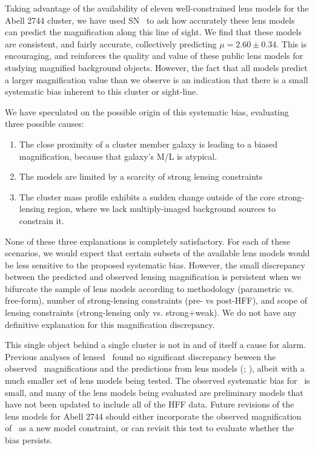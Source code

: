 Taking advantage of the availability of eleven well-constrained lens
models for the Abell 2744 cluster, we have used SN \tomas\ to ask
how accurately these lens models can predict the magnification along
this line of sight.   We find that these models are consistent, and
fairly accurate, collectively predicting $\mu=2.60\pm0.34$.  This is
encouraging, and reinforces the quality and value of these public lens
models for studying magnified background objects.   However, the fact
that all models predict a larger magnification value than we observe
is an indication that there is a small systematic bias inherent to
this cluster or sight-line. 

We have speculated on the possible origin of this systematic bias,
evaluating three possible causes: 

\begin{enumerate}
\item The close proximity of a cluster member galaxy is leading to a
biased magnification, because that galaxy's M/L is atypical.
\item The models are limited by a scarcity of strong lensing constraints
\item The cluster mass profile exhibits a sudden change outside of the core
strong-lensing region, where we lack multiply-imaged background
sources to constrain it. 
\end{enumerate}

\noindent None of these three explanations is completely
satisfactory.  For each of these scenarios, we would expect that
certain subsets of the available lens models would be less sensitive
to the proposed systematic bias.  However, the small discrepancy
between the predicted and observed lensing magnification is persistent
when we bifurcate the sample of lens models according to methodology
(parametric vs. free-form), number of strong-lensing constraints (pre-
vs post-HFF), and scope of lensing constraints (strong-lensing only
vs. strong+weak).  We do not have any definitive explanation for this
magnification discrepancy.

This single object behind a single cluster is not in and of itself a
cause for alarm.  Previous analyses of lensed \SNIa\ found no
significant discrepancy beween the observed \SNIa\ magnifications and
the predictions from lens models
(; \citealt{Nordin:2014}), albeit with a much
smaller set of lens models being tested.  The observed systematic bias
for \tomas\ is small, and many of the lens models being evaluated are
preliminary models that have not been updated to include all of the
HFF data.  Future revisions of the lens models for Abell 2744 should
either incorporate the observed magnification of \tomas\ as a new
model constraint, or can revisit this test to evaluate whether the
bias persists.

